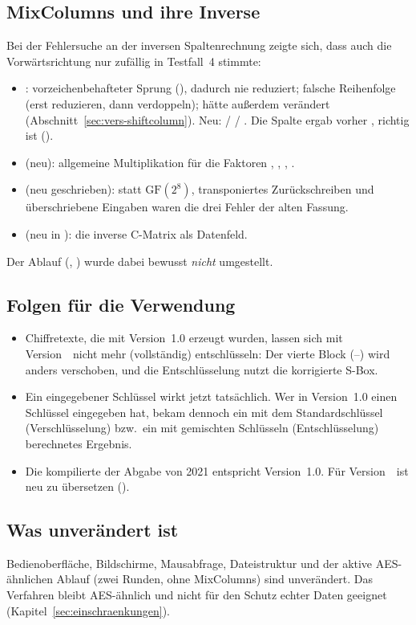 \subsection{MixColumns und ihre Inverse}\label{sec:aend-mixcolumns}
Bei der Fehlersuche an der inversen Spaltenrechnung zeigte sich, dass auch die Vorwärtsrichtung nur zufällig in Testfall~4 stimmte:
\begin{itemize}[noitemsep]
    \item \textbf{}: vorzeichenbehafteter Sprung (), dadurch nie reduziert; falsche Reihenfolge (erst reduzieren, dann verdoppeln);  hätte außerdem  verändert (Abschnitt~\ref{sec:vers-shiftcolumn}). Neu:  /  / . Die Spalte     ergab vorher    , richtig ist     (\cite{fips197}).
    \item \textbf{} (neu): allgemeine Multiplikation für die Faktoren , , , .
    \item \textbf{} (neu geschrieben):  statt $\mathrm{GF}(2^8)$, transponiertes Zurückschreiben und überschriebene Eingaben waren die drei Fehler der alten Fassung.
    \item \textbf{} (neu in ): die inverse C-Matrix als Datenfeld.
\end{itemize}
Der Ablauf (, ) wurde dabei bewusst \emph{nicht} umgestellt.

\subsection{Folgen für die Verwendung}
\begin{itemize}[noitemsep]
    \item Chiffretexte, die mit Version~1.0 erzeugt wurden, lassen sich mit Version~\versionProjekt\ nicht mehr (vollständig) entschlüsseln: Der vierte Block (--) wird anders verschoben, und die Entschlüsselung nutzt die korrigierte S-Box.
    \item Ein eingegebener Schlüssel wirkt jetzt tatsächlich. Wer in Version~1.0 einen Schlüssel eingegeben hat, bekam dennoch ein mit dem Standardschlüssel (Verschlüsselung) bzw.\ ein mit gemischten Schlüsseln (Entschlüsselung) berechnetes Ergebnis.
    \item Die kompilierte  der Abgabe von 2021 entspricht Version~1.0. Für Version~\versionProjekt\ ist neu zu übersetzen ().
\end{itemize}

\subsection{Was unverändert ist}
Bedienoberfläche, Bildschirme, Mausabfrage, Dateistruktur und der aktive \glqq AES-ähnlichen\grqq{} Ablauf (zwei Runden, ohne MixColumns) sind unverändert. Das Verfahren bleibt AES-ähnlich und nicht für den Schutz echter Daten geeignet (Kapitel~\ref{sec:einschraenkungen}).
